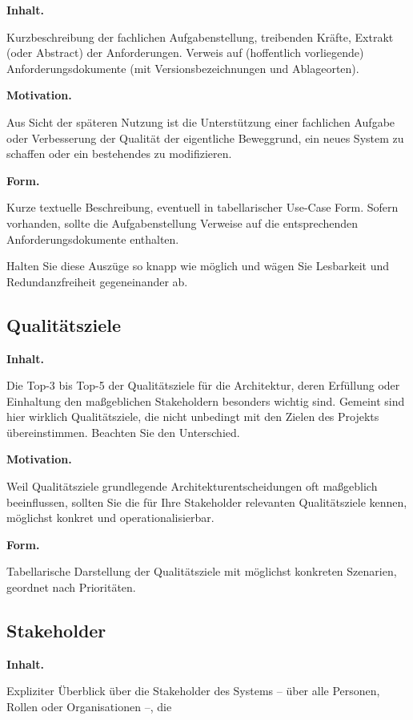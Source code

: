 \documentclass[]{article}
\begin{document}
\textbf{Inhalt.}

Kurzbeschreibung der fachlichen Aufgabenstellung, treibenden Kräfte,
Extrakt (oder Abstract) der Anforderungen. Verweis auf (hoffentlich
vorliegende) Anforderungsdokumente (mit Versionsbezeichnungen und
Ablageorten).

\textbf{Motivation.}

Aus Sicht der späteren Nutzung ist die Unterstützung einer fachlichen
Aufgabe oder Verbesserung der Qualität der eigentliche Beweggrund, ein
neues System zu schaffen oder ein bestehendes zu modifizieren.

\textbf{Form.}

Kurze textuelle Beschreibung, eventuell in tabellarischer Use-Case Form.
Sofern vorhanden, sollte die Aufgabenstellung Verweise auf die
entsprechenden Anforderungsdokumente enthalten.

Halten Sie diese Auszüge so knapp wie möglich und wägen Sie Lesbarkeit
und Redundanzfreiheit gegeneinander ab.

\hypertarget{_qualit_tsziele}{%
\subsection{Qualitätsziele}\label{_qualit_tsziele}}

\textbf{Inhalt.}

Die Top-3 bis Top-5 der Qualitätsziele für die Architektur, deren
Erfüllung oder Einhaltung den maßgeblichen Stakeholdern besonders
wichtig sind. Gemeint sind hier wirklich Qualitätsziele, die nicht
unbedingt mit den Zielen des Projekts übereinstimmen. Beachten Sie den
Unterschied.

\textbf{Motivation.}

Weil Qualitätsziele grundlegende Architekturentscheidungen oft
maßgeblich beeinflussen, sollten Sie die für Ihre Stakeholder relevanten
Qualitätsziele kennen, möglichst konkret und operationalisierbar.

\textbf{Form.}

Tabellarische Darstellung der Qualitätsziele mit möglichst konkreten
Szenarien, geordnet nach Prioritäten.

\hypertarget{_stakeholder}{%
\subsection{Stakeholder}\label{_stakeholder}}

\textbf{Inhalt.}

Expliziter Überblick über die Stakeholder des Systems -- über alle
Personen, Rollen oder Organisationen --, die
\end{document}
